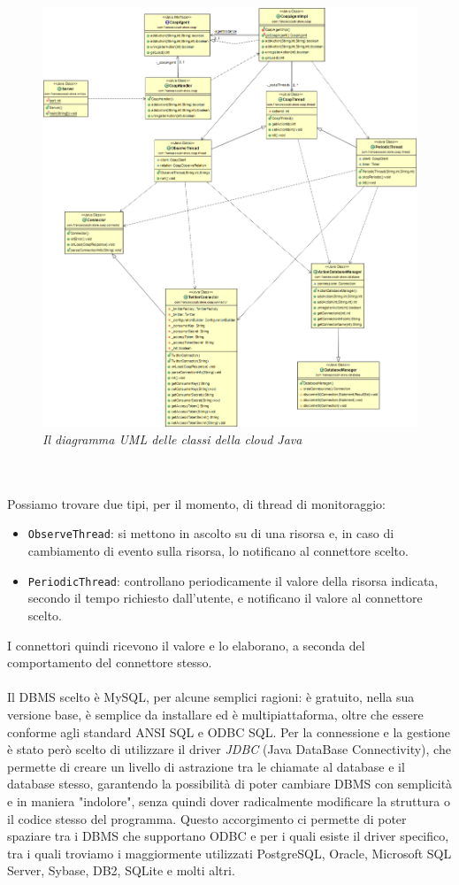 \begin{figure}[pt]
\centering
\includegraphics[width=\textwidth]{immagini/uml.png}
\caption{\textit{Il diagramma UML delle classi della cloud Java}}
\end{figure}
\\\\Possiamo trovare due tipi, per il momento, di thread di monitoraggio:
\begin{itemize}
\item {\tt ObserveThread}: si mettono in ascolto su di una risorsa e, in caso di cambiamento di evento sulla risorsa, lo notificano al connettore scelto.
\item {\tt PeriodicThread}: controllano periodicamente il valore della risorsa indicata, secondo il tempo richiesto dall'utente, e notificano il valore al connettore scelto.
\end{itemize}
I connettori quindi ricevono il valore e lo elaborano, a seconda del comportamento del connettore stesso.
\\\\Il DBMS scelto è MySQL, per alcune semplici ragioni: è gratuito, nella sua versione base, è semplice da installare ed è multipiattaforma, oltre che essere conforme agli standard ANSI SQL e ODBC SQL. Per la connessione e la gestione è stato però scelto di utilizzare il driver \textit{JDBC} (Java DataBase Connectivity), che permette di creare un livello di astrazione tra le chiamate al database e il database stesso, garantendo la possibilità di poter cambiare DBMS con semplicità e in maniera "indolore", senza quindi dover radicalmente modificare la struttura o il codice stesso del programma. Questo accorgimento ci permette di poter spaziare tra i DBMS che supportano ODBC e per i quali esiste il driver specifico, tra i quali troviamo i maggiormente utilizzati PostgreSQL, Oracle, Microsoft SQL Server, Sybase, DB2, SQLite e molti altri.
